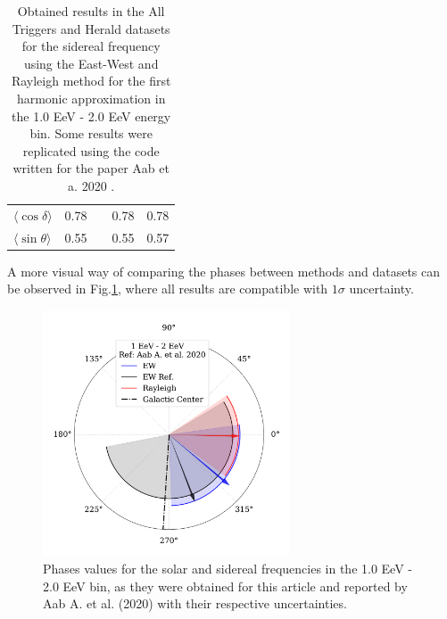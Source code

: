 \documentclass[12pt, doublespace, oneside]{article}
\begin{document}
\begin{table}[H]
\begin{small}
\begin{center}
\begin{tabular}[c]{l|c|c|c||c|}
\multicolumn{1}{|l|}{$\langle\cos\delta\rangle$}&{0.78}&  &{0.78}                        & 0.78       \\        
\multicolumn{1}{|l|}{$\langle\sin\theta\rangle$}&{0.55}&  &{0.55}                        & 0.57       \\ \hline       
\end{tabular}
            \end{center}
        \end{small}
        \vspace*{-0.21 cm}
        \caption{Obtained results in the All Triggers and Herald datasets for the sidereal frequency using the East-West and Rayleigh method for the first harmonic approximation in the 1.0 EeV - 2.0 EeV energy bin. Some results were replicated using the code written for the paper Aab et a. 2020 \cite{Aab_2020}.}
        \label{tab:siderea_3}
    \end{table}

    
    A more visual way of comparing the phases between methods and datasets can be observed in Fig.\ref{fig:tercer}, where all results are compatible with $1\sigma$ uncertainty.


    \begin{figure}[H]
        \begin{small}
            \begin{center}
                \vspace*{-0.65 cm}
                \includegraphics[width=0.65\textwidth]{Figs/phase_tercer_bin_v3.pdf}
                \vspace*{-1.2 cm}
            \end{center}
        \caption{Phases values for the solar and sidereal frequencies in the 1.0 EeV - 2.0 EeV bin, as they were obtained for this article and reported by  Aab A. et al. (2020) \cite{Aab_2020} with their respective uncertainties.}
        \label{fig:tercer}
        \end{small}
    \end{figure}
\end{document}
